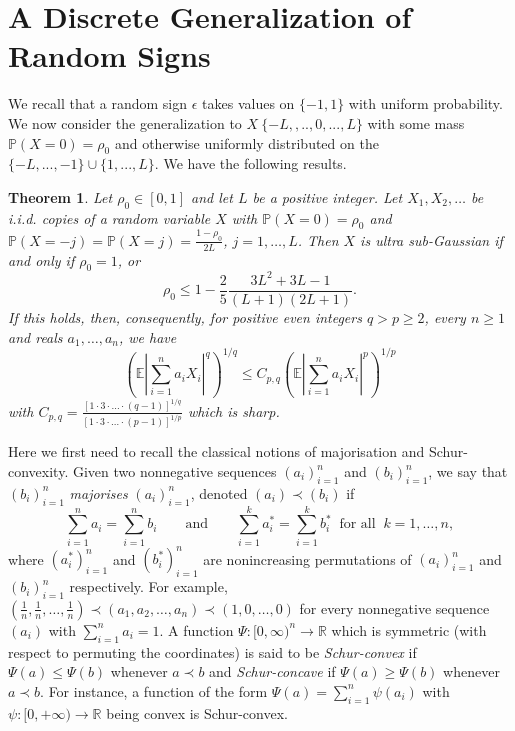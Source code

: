 \documentclass[10pt]{article}
\newcommand{\Pp}{\mathbb{P}}
\newcommand{\E}{\mathbb{E}}
\newcommand{\1}{\textbf{1}}
\newcommand{\R}{\mathbb{R}}
\newcommand{\p}[1]{\mathbb{P}\left( #1 \right)}
\newtheorem{theorem}{Theorem}
\theoremstyle{remark}
\theoremstyle{definition}
\begin{document}
\section{A Discrete Generalization of Random Signs}

We recall that a random sign $\epsilon$ takes values on $\{-1,1\}$ with uniform probability. We now consider the generalization to $X ~ \{-L,,..,0,...,L\}$ with some mass $\Pp(X = 0) = \rho_0$ and otherwise uniformly distributed on the $\{-L,...,-1\} \cup \{1,...,L\}$. We have the following results.

\begin{theorem}\label{thm:USG}
Let $\rho_0 \in [0,1]$ and let $L$ be a positive integer. Let $X_1, X_2,\dots$ be i.i.d. copies of a random variable $X$ with $\p{X=0} = \rho_0$ and $\p{X = -j} = \p{X = j} = \frac{1-\rho_0}{2L}$, $j = 1,\dots,L$. Then $X$ is ultra sub-Gaussian if and only if $\rho_0 = 1$, or
\begin{equation}\label{eq:USG-rho}
\rho_0 \leq 1 - \frac{2}{5}\frac{3L^2+3L-1}{(L+1)(2L+1)}.
\end{equation}
If this holds, then, consequently, for positive even integers $q > p \geq 2$, every $n \geq 1$ and reals $a_1,\dots,a_n$, we have
\begin{equation}\label{eq:Khin-even}
\left(\E\left|\sum_{i=1}^n a_iX_i\right|^q\right)^{1/q} \leq C_{p,q}\left(\E\left|\sum_{i=1}^n a_iX_i\right|^p\right)^{1/p}
\end{equation}
with $C_{p,q} = \frac{[1\cdot 3\cdot\ldots \cdot (q-1)]^{1/q}}{[1\cdot 3\cdot\ldots \cdot (p-1)]^{1/p}}$ which is sharp.
\end{theorem}

Here we first need to recall the classical notions of majorisation and Schur-convexity. Given two nonnegative sequences $(a_i)_{i=1}^n$ and $(b_i)_{i=1}^n$, we say that $(b_i)_{i=1}^n$ \emph{majorises} $(a_i)_{i=1}^n$, denoted $(a_i) \prec (b_i)$ if
\[
\sum_{i=1}^n a_i = \sum_{i=1}^n b_i \qquad \text{and} \qquad \sum_{i=1}^k a_i^* = \sum_{i=1}^k b_i^* \ \text{ for all } \ k = 1,\ldots,n,
\]
where $(a_i^*)_{i=1}^n$ and $(b_i^*)_{i=1}^n$ are nonincreasing permutations of $(a_i)_{i=1}^n$ and $(b_i)_{i=1}^n$ respectively. For example, $(\frac{1}{n},\frac{1}{n},\dots,\frac{1}{n}) \prec (a_1,a_2,\dots,a_n) \prec (1,0,\dots,0)$ for every nonnegative sequence $(a_i)$ with $\sum_{i=1}^n a_i = 1$. A function $\Psi\colon [0,\infty)^n \to \R$ which is symmetric (with respect to permuting the coordinates) is said to be \emph{Schur-convex} if $\Psi(a) \leq \Psi(b)$ whenever $a \prec b$ and \emph{Schur-concave} if $\Psi(a) \geq \Psi(b)$ whenever $a \prec b$. For instance, a function of the form $\Psi(a) = \sum_{i=1}^n \psi(a_i)$ with $\psi\colon [0,+\infty) \to \R$ being convex is Schur-convex.
\end{document}
